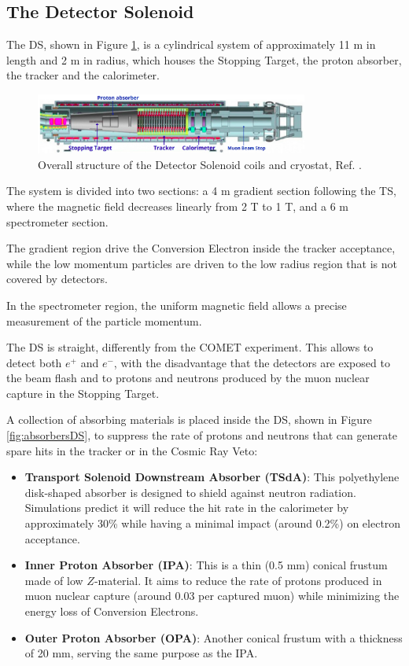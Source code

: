 \subsection{The Detector Solenoid}
The DS, shown in Figure \ref{fig:DS}, is a cylindrical system of approximately 11 m in 
length and 2 m in radius, which houses the Stopping Target, 
the proton absorber, the tracker and the calorimeter. 
\begin{figure}[!h]
    \centering
    \includegraphics[width =0.8\textwidth]{figures/png/Screenshot_20240306_225639.png}
    \caption[The structure of the Detector Solenoid coils and cryostat.]{Overall structure of the Detector Solenoid coils and cryostat, Ref. \cite{bobbb}.}
    \label{fig:DS}
    \end{figure}
The system is divided into two sections: a 4 m gradient section following the TS, 
where the magnetic field decreases linearly from 2 T to 1 T, and a 6 
m spectrometer section. 

The gradient region drive the Conversion Electron 
inside the tracker acceptance, while the low momentum particles 
are driven to the low radius region that is not covered by detectors.  

In the spectrometer region, the uniform magnetic field allows a precise 
measurement of the particle momentum. 

The DS is straight, differently from the COMET experiment. This allows 
to detect both $e^+$ and $e^-$, with the disadvantage that the detectors are exposed to the 
beam flash and to protons and neutrons produced by the muon
nuclear capture in the Stopping Target.

A collection of absorbing materials is placed inside the DS, shown in 
Figure \ref{fig:absorbersDS}, to suppress 
the rate of protons and neutrons that can generate spare hits in the 
tracker or in the Cosmic Ray Veto:
\begin{itemize}
    \item \textbf{Transport Solenoid Downstream Absorber (TSdA)}: This 
    polyethylene disk-shaped absorber is designed to shield against neutron radiation. 
    Simulations predict it will reduce the hit rate in the calorimeter by approximately 30\% 
    while having a minimal impact (around 0.2\%) on electron acceptance.
    \item \textbf{Inner Proton Absorber (IPA)}: This is a thin (0.5 mm) conical 
    frustum made of low $Z$-material. It aims to reduce the rate of protons produced 
    in muon nuclear capture (around 0.03 per captured muon) while minimizing the 
    energy loss of Conversion Electrons.
    \item \textbf{Outer Proton Absorber (OPA)}: Another conical frustum with a 
    thickness of 20 mm, serving the same purpose as the IPA.
\end{itemize}


